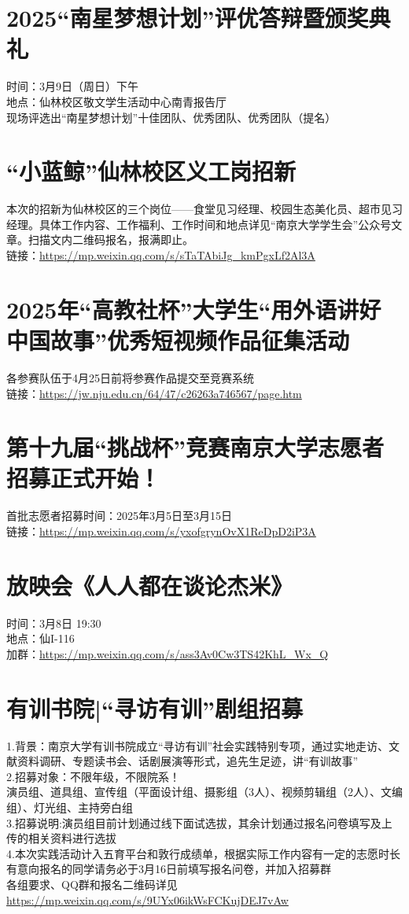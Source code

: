 \documentclass[letterpaper, 12pt]{article}
\begin{document}
\begin{multicols}{2}
\section{2025“南星梦想计划”评优答辩暨颁奖典礼}
时间：3月9日（周日）下午\\
地点：仙林校区敬文学生活动中心南青报告厅\\
现场评选出“南星梦想计划”十佳团队、优秀团队、优秀团队（提名）


\section{“小蓝鲸”仙林校区义工岗招新}
本次的招新为仙林校区的三个岗位——食堂见习经理、校园生态美化员、超市见习经理。具体工作内容、工作福利、工作时间和地点详见“南京大学学生会”公众号文章。扫描文内二维码报名，报满即止。\\
链接：\url{https://mp.weixin.qq.com/s/sTaTAbiJg_kmPgxLf2Al3A}

\section{2025年“高教社杯”大学生“用外语讲好中国故事”优秀短视频作品征集活动}
各参赛队伍于4月25日前将参赛作品提交至竞赛系统\\
链接：\url{https://jw.nju.edu.cn/64/47/c26263a746567/page.htm}

\section{第十九届“挑战杯”竞赛南京大学志愿者招募正式开始！}
首批志愿者招募时间：2025年3月5日至3月15日\\
链接：\url{https://mp.weixin.qq.com/s/yxofgrynOvX1ReDpD2iP3A}

\section{放映会《人人都在谈论杰米》}
时间：3月8日 19:30\\
地点：仙I-116\\
加群：\url{https://mp.weixin.qq.com/s/ass3Av0Cw3TS42KhL_Wx_Q}

\section{有训书院|“寻访有训”剧组招募}
1.背景：南京大学有训书院成立“寻访有训”社会实践特别专项，通过实地走访、文献资料调研、专题读书会、话剧展演等形式，追先生足迹，讲“有训故事”\\
2.招募对象：不限年级，不限院系！\\
演员组、道具组、宣传组（平面设计组、摄影组（3人）、视频剪辑组（2人）、文编组）、灯光组、主持旁白组\\
3.招募说明:演员组目前计划通过线下面试选拔，其余计划通过报名问卷填写及上传的相关资料进行选拔\\
4.本次实践活动计入五育平台和敦行成绩单，根据实际工作内容有一定的志愿时长\\
有意向报名的同学请务必于3月16日前填写报名问卷，并加入招募群\\
各组要求、QQ群和报名二维码详见\url{https://mp.weixin.qq.com/s/9UYx06ikWsFCKujDEJ7vAw}


\end{multicols}
\end{document}
